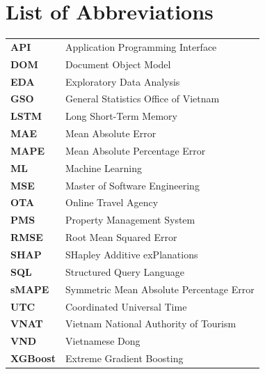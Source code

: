 \chapter*{List of Abbreviations}

\begin{singlespace}
\begin{longtable}{p{3cm} p{11cm}}
\textbf{API} & Application Programming Interface \\
\textbf{DOM} & Document Object Model \\
\textbf{EDA} & Exploratory Data Analysis \\
\textbf{GSO} & General Statistics Office of Vietnam \\
\textbf{LSTM} & Long Short-Term Memory \\
\textbf{MAE} & Mean Absolute Error \\
\textbf{MAPE} & Mean Absolute Percentage Error \\
\textbf{ML} & Machine Learning \\
\textbf{MSE} & Master of Software Engineering \\
\textbf{OTA} & Online Travel Agency \\
\textbf{PMS} & Property Management System \\
\textbf{RMSE} & Root Mean Squared Error \\
\textbf{SHAP} & SHapley Additive exPlanations \\
\textbf{SQL} & Structured Query Language \\
\textbf{sMAPE} & Symmetric Mean Absolute Percentage Error \\
\textbf{UTC} & Coordinated Universal Time \\
\textbf{VNAT} & Vietnam National Authority of Tourism \\
\textbf{VND} & Vietnamese Dong \\
\textbf{XGBoost} & Extreme Gradient Boosting \\
\end{longtable}
\end{singlespace}

\clearpage
